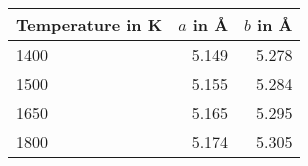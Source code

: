 \begin{tabular}{l|rr}
\toprule
    Temperature in K  &  $a$ in \unit{\angstrom}  &  $b$ in \unit{\angstrom} \\ 
\midrule
          \num{1400}  &           \num{5.149}  &           \num{5.278} \\ 
          \num{1500}  &           \num{5.155}  &           \num{5.284} \\ 
          \num{1650}  &           \num{5.165}  &           \num{5.295} \\ 
          \num{1800}  &           \num{5.174}  &           \num{5.305} \\ 
\bottomrule
\end{tabular}
